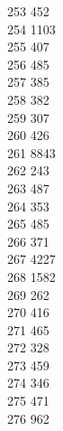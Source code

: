 { 253	452 \\
 254	1103 \\
 255	407 \\
 256	485 \\
 257	385 \\
 258	382 \\
 259	307 \\
 260	426 \\
 261	8843 \\
 262	243 \\
 263	487 \\
 264	353 \\
 265	485 \\
 266	371 \\
 267	4227 \\
 268	1582 \\
 269	262 \\
 270	416 \\
 271	465 \\
 272	328 \\
 273	459 \\
 274	346 \\
 275	471 \\
 276	962 \\
}
